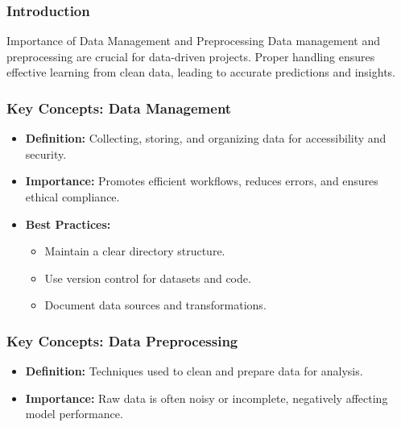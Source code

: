 \documentclass[aspectratio=169]{beamer}
\begin{document}
\begin{frame}
    \titlepage
\end{frame}

\begin{frame}
    \frametitle{Introduction}
    \begin{block}{Importance of Data Management and Preprocessing}
        Data management and preprocessing are crucial for data-driven projects. Proper handling ensures effective learning from clean data, leading to accurate predictions and insights.
    \end{block}
\end{frame}

\begin{frame}
    \frametitle{Key Concepts: Data Management}
    \begin{itemize}
        \item \textbf{Definition:} Collecting, storing, and organizing data for accessibility and security.
        \item \textbf{Importance:} Promotes efficient workflows, reduces errors, and ensures ethical compliance.
        \item \textbf{Best Practices:}
            \begin{itemize}
                \item Maintain a clear directory structure.
                \item Use version control for datasets and code.
                \item Document data sources and transformations.
            \end{itemize}
    \end{itemize}
\end{frame}

\begin{frame}
    \frametitle{Key Concepts: Data Preprocessing}
    \begin{itemize}
        \item \textbf{Definition:} Techniques used to clean and prepare data for analysis.
        \item \textbf{Importance:} Raw data is often noisy or incomplete, negatively affecting model performance.
    \end{itemize}
\end{frame}
\end{document}
